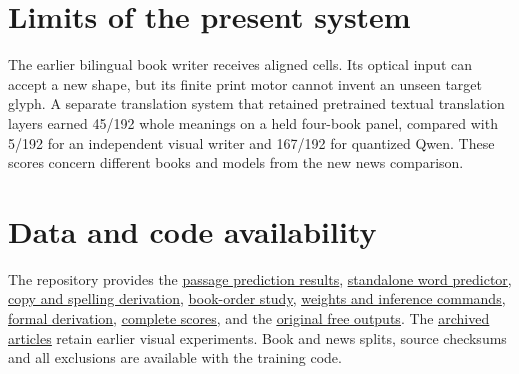 \documentclass[10pt,a4paper]{article}
\newcommand{\repo}[2]{\href{https://github.com/lachlanchen/ImagizedLanguageModel/blob/main/#1}{\underline{#2}}}
\begin{document}
\begin{multicols}{2}
\section*{Limits of the present system}
The earlier bilingual book writer receives aligned cells. Its optical input can accept a new shape, but its finite print motor cannot invent an unseen target glyph. A separate translation system that retained pretrained textual translation layers earned 45/192 whole meanings on a held four-book panel, compared with 5/192 for an independent visual writer and 167/192 for quantized Qwen. These scores concern different books and models from the new news comparison.
\columnbreak
\section*{Data and code availability}
\raggedright The repository provides the \repo{references/optical_passage_selector_result.md}{passage prediction results}, \repo{models/optical_passage_selector}{standalone word predictor}, \repo{formal/span_list/VisualPassageSelection.lean}{copy and spelling derivation}, \repo{references/book_order_prior_result.md}{book-order study}, \repo{models/book_order_prior}{weights and inference commands}, \repo{formal/span_list/BookOrderPrior.lean}{formal derivation}, \repo{references/evidence/book_order_prior_v1}{complete scores}, and the \repo{publication/ilm-nature/evidence}{original free outputs}. The \repo{publication/ilm-nature/versions}{archived articles} retain earlier visual experiments. Book and news splits, source checksums and all exclusions are available with the training code.
\end{multicols}
\end{document}
